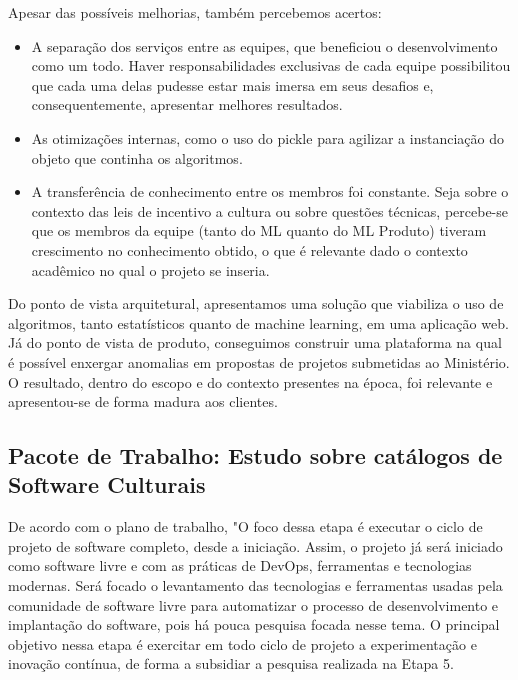 Apesar das possíveis melhorias, também percebemos acertos:

\begin{itemize}
\tightlist
\item
  A separação dos serviços entre as equipes, que beneficiou o
  desenvolvimento como um todo. Haver responsabilidades exclusivas de
  cada equipe possibilitou que cada uma delas pudesse estar mais imersa
  em seus desafios e, consequentemente, apresentar melhores resultados.
\item
  As otimizações internas, como o uso do pickle para agilizar a
  instanciação do objeto que continha os algoritmos.
\item
  A transferência de conhecimento entre os membros foi constante. Seja
  sobre o contexto das leis de incentivo a cultura ou sobre questões
  técnicas, percebe-se que os membros da equipe (tanto do ML quanto do
  ML Produto) tiveram crescimento no conhecimento obtido, o que é
  relevante dado o contexto acadêmico no qual o projeto se inseria.
\end{itemize}

Do ponto de vista arquitetural, apresentamos uma solução que viabiliza o
uso de algoritmos, tanto estatísticos quanto de machine learning, em uma
aplicação web. Já do ponto de vista de produto, conseguimos construir
uma plataforma na qual é possível enxergar anomalias em propostas de
projetos submetidas ao Ministério. O resultado, dentro do escopo e do
contexto presentes na época, foi relevante e apresentou-se de forma
madura aos clientes.

\hypertarget{pacote-de-trabalho-estudo-sobre-catuxe1logos-de-software-culturais}{%
\subsection{Pacote de Trabalho: Estudo sobre catálogos de Software
Culturais}\label{pacote-de-trabalho-estudo-sobre-catuxe1logos-de-software-culturais}}

De acordo com o plano de trabalho, "O foco dessa etapa é executar o
ciclo de projeto de software completo, desde a iniciação. Assim, o
projeto já será iniciado como software livre e com as práticas de
DevOps, ferramentas e tecnologias modernas. Será focado o levantamento
das tecnologias e ferramentas usadas pela comunidade de software livre
para automatizar o processo de desenvolvimento e implantação do
software, pois há pouca pesquisa focada nesse tema. O principal objetivo
nessa etapa é exercitar em todo ciclo de projeto a experimentação e
inovação contínua, de forma a subsidiar a pesquisa realizada na Etapa 5.

